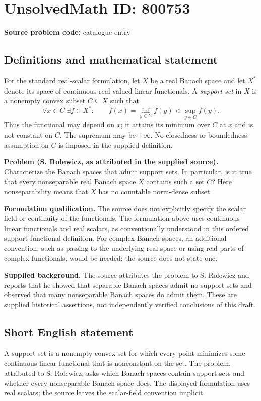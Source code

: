 \documentclass[11pt]{article}
\begin{document}
\section*{UnsolvedMath ID: 800753}
\textbf{Source problem code:} catalogue entry
\subsection{Definitions and mathematical statement}
For the standard real-scalar formulation, let \(X\) be a real Banach space and let \(X^*\) denote its space of continuous real-valued linear functionals. A \emph{support set} in \(X\) is a nonempty convex subset \(C\subseteq X\) such that
\[
\forall x\in C\;\exists f\in X^*:\qquad
f(x)=\inf_{y\in C}f(y)<\sup_{y\in C}f(y).
\]
Thus the functional may depend on \(x\); it attains its minimum over \(C\) at \(x\) and is not constant on \(C\). The supremum may be \(+\infty\). No closedness or boundedness assumption on \(C\) is imposed in the supplied definition.

\textbf{Problem (S. Rolewicz, as attributed in the supplied source).} Characterize the Banach spaces that admit support sets. In particular, is it true that every nonseparable real Banach space \(X\) contains such a set \(C\)? Here nonseparability means that \(X\) has no countable norm-dense subset.

\textbf{Formulation qualification.} The source does not explicitly specify the scalar field or continuity of the functionals. The formulation above uses continuous linear functionals and real scalars, as conventionally understood in this ordered support-functional definition. For complex Banach spaces, an additional convention, such as passing to the underlying real space or using real parts of complex functionals, would be needed; the source does not state one.

\textbf{Supplied background.} The source attributes the problem to S. Rolewicz and reports that he showed that separable Banach spaces admit no support sets and observed that many nonseparable Banach spaces do admit them. These are supplied historical assertions, not independently verified conclusions of this draft.
\subsection{Short English statement}
A support set is a nonempty convex set for which every point minimizes some continuous linear functional that is nonconstant on the set. The problem, attributed to S. Rolewicz, asks which Banach spaces contain support sets and whether every nonseparable Banach space does. The displayed formulation uses real scalars; the source leaves the scalar-field convention implicit.
\end{document}
